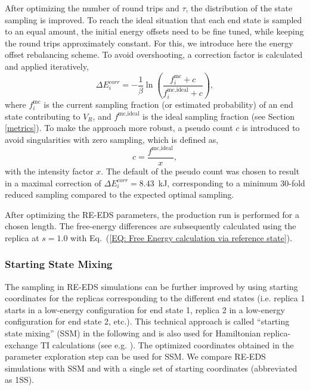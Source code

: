 After optimizing the number of round trips and $\tau$, the distribution of the state sampling is improved. To reach the ideal situation that each end state is sampled to an equal amount, the initial energy offsets need to be fine tuned, while keeping the round trips approximately constant. For this, we introduce here the energy offset rebalancing scheme.
To avoid overshooting, a correction factor is calculated and applied iteratively,
\begin{equation}
    \Delta E^{corr}_i = - \frac{1}{\beta} \ln \left( \frac{f_i^{\text{mc}}+c}{f^{\text{mc,ideal}}_{i}+c} \right),
    \label{eq: EoffRebalancing}
\end{equation}
where $f_i^{\text{mc}}$ is the current sampling fraction (or estimated probability) of an end state contributing to $V_R $, and $f^{\text{mc,ideal}}$ is the ideal sampling fraction (see Section \ref{metrics}). 
%
To make the approach more robust, a pseudo count $c$ is introduced to avoid singularities with zero sampling, which is defined as,
\begin{equation}
    c = \frac{f^{\text{mc,ideal}}}{x},
    \label{eq: EoffRebalancingPseudoCount}
\end{equation}
with the intensity factor $x$.
The default of the pseudo count was chosen to result in a maximal correction of $\Delta E^{corr}_i=8.43$~kJ, corresponding to a minimum 30-fold reduced sampling compared to the expected optimal sampling.

After optimizing the RE-EDS parameters, the production run is performed for a chosen length. 
The free-energy differences are subsequently calculated using the replica at $s=1.0$ with Eq.~(\ref{EQ: Free Energy calculation via reference state}).

\subsubsection{Starting State Mixing}
The sampling in RE-EDS simulations can be further improved by using starting coordinates for the replicas corresponding to the different end states (i.e. replica 1 starts in a low-energy configuration for end state 1, replica 2 in a low-energy configuration for end state 2, etc.). This technical approach is called ``starting state mixing'' (SSM) in the following and is also used for Hamiltonian replica-exchange TI calculations (see e.g. \cite{Graf2016, Hahn2020}). The optimized coordinates obtained in the parameter exploration step can be used for SSM. We compare RE-EDS simulations with SSM and with a single set of starting coordinates (abbreviated as 1SS).  

